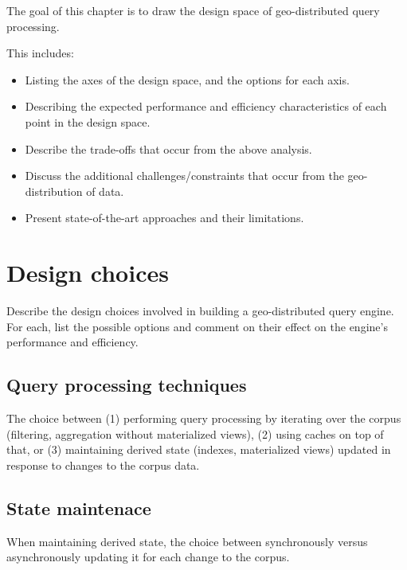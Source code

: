 The goal of this chapter is to draw the design space of geo-distributed query processing.

This includes:
\begin{itemize}
  \item Listing the axes of the design space, and the options for each axis.
  \item Describing the expected performance and efficiency characteristics
  of each point in the design space.
  \item Describe the trade-offs that occur from the above analysis.
  \item Discuss the additional challenges/constraints that occur from the geo-
  distribution of data.
  \item Present state-of-the-art approaches and their limitations.
\end{itemize}

\section{Design choices}
Describe the design choices involved in building a geo-distributed query engine.
For each, list the possible options and comment on their effect on the engine's
performance and efficiency.

\subsection{Query processing techniques}
The choice between (1) performing query processing by iterating over the corpus
(filtering, aggregation without materialized views), (2) using caches on top of
that, or (3) maintaining derived state (indexes, materialized views) updated in
response to changes to the corpus data.

\subsection{State maintenace}
When maintaining derived state, the choice between synchronously versus
asynchronously updating it for each change to the corpus.

